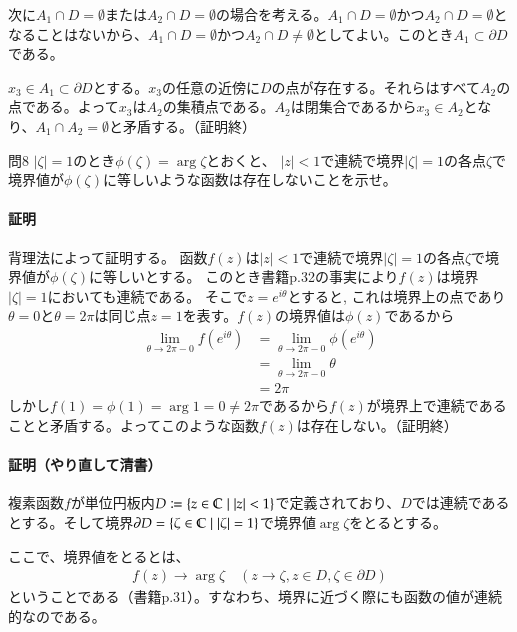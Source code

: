 次に$A_1\cap D=\emptyset$または$A_2\cap D=\emptyset$の場合を考える。$A_1\cap D=\emptyset$かつ$A_2\cap D=\emptyset$となることはないから、$A_1\cap D=\emptyset$かつ$A_2\cap D\neq\emptyset$としてよい。このとき$A_1\subset\partial D$である。

$x_3\in A_1\subset\partial D$とする。$x_3$の任意の近傍に$D$の点が存在する。それらはすべて$A_2$の点である。よって$x_3$は$A_2$の集積点である。$A_2$は閉集合であるから$x_3\in A_2$となり、$A_1\cap A_2=\emptyset$と矛盾する。（証明終）

\begin{mysimplebox}{問8}
    $|\zeta|=1$のとき$\phi(\zeta)=\arg \zeta$とおくと、
    $|z|<1$で連続で境界$|\zeta|=1$の各点$\zeta$で境界値が$\phi(\zeta)$に等しいような函数は存在しないことを示せ。
\end{mysimplebox}
\paragraph{証明}
背理法によって証明する。
函数$f(z)$は$|z|<1$で連続で境界$|\zeta|=1$の各点$\zeta$で境界値が$\phi(\zeta)$に等しいとする。
このとき書籍p.32の事実により$f(z)$は境界$|\zeta|=1$においても連続である。
そこで$z=e^{i\theta}$とすると,
これは境界上の点であり$\theta=0$と$\theta=2\pi$は同じ点$z=1$を表す。$f(z)$の境界値は$\phi(z)$であるから
\begin{align*}
    \lim_{\theta\to 2\pi-0}f(e^{i\theta})
    &=\lim_{\theta\to 2\pi-0}\phi(e^{i\theta})\\
    &=\lim_{\theta\to 2\pi-0}\theta\\
    &=2\pi
\end{align*}
しかし$f(1)=\phi(1)=\arg 1=0\neq 2\pi$であるから$f(z)$が境界上で連続であることと矛盾する。よってこのような函数$f(z)$は存在しない。（証明終）

\paragraph{証明（やり直して清書）}

複素函数$f$が単位円板内$D\coloneqq\{z\in\mathbb{C}\mid|z|<1\}$で定義されており、$D$では連続であるとする。そして境界$\partial D=\{\zeta\in\mathbb{C}\mid|\zeta|=1\}$で境界値$\arg \zeta$をとるとする。

ここで、境界値をとるとは、
\begin{align*}
    f(z)\longrightarrow \arg \zeta\quad(z\longrightarrow \zeta,z\in D,\zeta\in\partial D)
\end{align*}
ということである（書籍p.31）。すなわち、境界に近づく際にも函数の値が連続的なのである。

